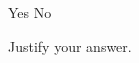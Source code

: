 \documentclass{../../oss-apphys-exam}
\begin{document}
\begin{questions}
\begin{parts}
    \vspace{.2in}
    \underline{\hspace{.5in}} Yes\hspace{.5in}
    \underline{\hspace{.5in}} No

    \vspace{.2in}Justify your answer.
    \vspace{\stretch1}
  \end{parts}
  \newpage

%
%

\end{questions}
\end{document}

